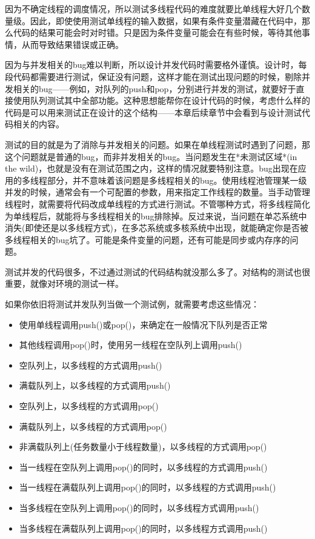 因为不确定线程的调度情况，所以测试多线程代码的难度就要比单线程大好几个数量级。因此，即使使用测试单线程的输入数据，如果有条件变量潜藏在代码中，那么代码的结果可能会时对时错。只是因为条件变量可能会在有些时候，等待其他事情，从而导致结果错误或正确。

因为与并发相关的bug难以判断，所以设计并发代码时需要格外谨慎。设计时，每段代码都需要进行测试，保证没有问题，这样才能在测试出现问题的时候，剔除并发相关的bug——例如，对队列的push和pop，分别进行并发的测试，就要好于直接使用队列测试其中全部功能。这种思想能帮你在设计代码的时候，考虑什么样的代码是可以用来测试正在设计的这个结构——本章后续章节中会看到与设计测试代码相关的内容。

测试的目的就是为了消除与并发相关的问题。如果在单线程测试时遇到了问题，那这个问题就是普通的bug，而非并发相关的bug。当问题发生在*未测试区域*(in the wild)，也就是没有在测试范围之内，这样的情况就要特别注意。bug出现在应用的多线程部分，并不意味着该问题是多线程相关的bug。使用线程池管理某一级并发的时候，通常会有一个可配置的参数，用来指定工作线程的数量。当手动管理线程时，就需要将代码改成单线程的方式进行测试。不管哪种方式，将多线程简化为单线程后，就能将与多线程相关的bug排除掉。反过来说，当问题在单芯系统中消失(即使还是以多线程方式)，在多芯系统或多核系统中出现，就能确定你是否被多线程相关的bug坑了。可能是条件变量的问题，还有可能是同步或内存序的问题。

测试并发的代码很多，不过通过测试的代码结构就没那么多了。对结构的测试也很重要，就像对环境的测试一样。

如果你依旧将测试并发队列当做一个测试例，就需要考虑这些情况：

\begin{itemize}
    \item 使用单线程调用push()或pop()，来确定在一般情况下队列是否正常
    \item 其他线程调用pop()时，使用另一线程在空队列上调用push()
    \item 空队列上，以多线程的方式调用push()
    \item 满载队列上，以多线程的方式调用push()
    \item 空队列上，以多线程的方式调用pop()
    \item 满载队列上，以多线程的方式调用pop()
    \item 非满载队列上(任务数量小于线程数量)，以多线程的方式调用pop()
    \item 当一线程在空队列上调用pop()的同时，以多线程的方式调用push()
    \item 当一线程在满载队列上调用pop()的同时，以多线程的方式调用push()
    \item 当多线程在空队列上调用pop()的同时，以多线程方式调用push()
    \item 当多线程在满载队列上调用pop()的同时，以多线程方式调用push()
\end{itemize}

